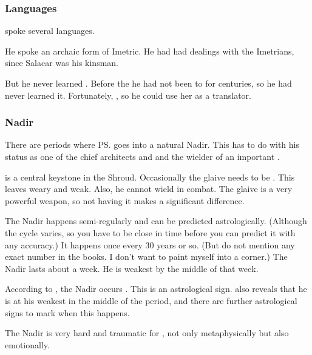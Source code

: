 \subsubsection{Languages}
\Ishnaruchaefir{} spoke several languages. 

He spoke an archaic form of Imetric. 
He had had dealings with the Imetrians, since Salacar was his kinsman. 

But he never learned \Velcadian. 
Before the \thirdbanewar{} he had not been to \Azmith{} for centuries, so he had never learned it. 
Fortunately, , so he could use her as a translator. 





\subsubsection{Nadir}
There are periods where \ps{\Ishnaruchaefir} \vertex{} goes into a natural Nadir. 
This has to do with his status as one of the chief architects and  and the wielder of an important . 

\Rystessakhin{} is a central keystone in the Shroud. 
Occasionally the glaive needs to be . 
This leaves \Ishnaruchaefir{} weary and weak. 
Also, he cannot wield \Rystessakhin{} in combat.
The glaive is a very powerful weapon, so not having it makes a significant difference. 

The Nadir happens semi-regularly and can be predicted astrologically. 
(Although the cycle varies, so you have to be close in time before you can predict it with any accuracy.)
It happens once every 30 years or so. 
(But do not mention any exact number in the books. I don't want to paint myself into a corner.)
The Nadir lasts about a week. 
He is weakest by the middle of that week. 

According to \WanderersInDarknessEmph, the Nadir occurs . 
This is an astrological sign. 
\WanderersInDarknessEmph also reveals that he is at his weakest in the middle of the period, and there are further astrological signs to mark when this happens. 

The Nadir is very hard and traumatic for \Ishnaruchaefir, not only metaphysically but also emotionally. 

